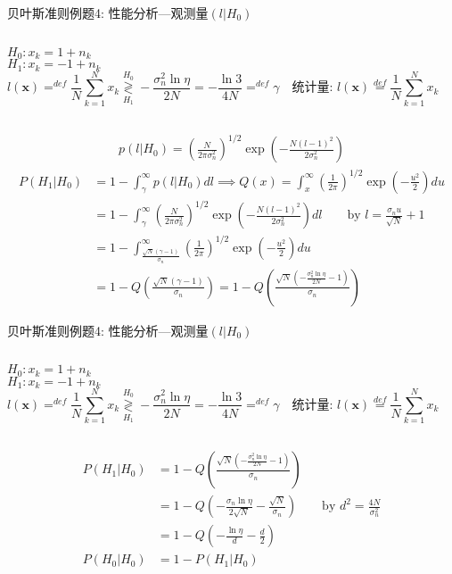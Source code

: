 \begin{frame}[shrink]{贝叶斯准则例题4: 性能分析---观测量$(l|H_0)$}
\begin{columns}
	$H_0:x_k=1+n_k$\\
	$H_1:x_k=-1+n_k$
	\[
	l(\bm{x})\mathop{=}^{def}\frac{1}{N}\sum\limits_{k=1}^{N}x_k\mathop{\gtrless}\limits_{H_1}^{H_0}-\frac{\sigma_n^2\ln\eta}{2N}=-\frac{\ln3}{4N}\mathop{=}^{def}\gamma \quad \textbf{统计量: }l(\bm{x})\mathop{=}\limits^{def}\frac{1}{N}\sum\limits_{k=1}^{N}x_k
	\]
\end{columns}
\begin{align*}
p(l|H_0)=\left(\frac{N}{2\pi\sigma_n^2}\right)^{1/2}\exp\left(-\frac{N(l-1)^2}{2\sigma_n^2}\right)
\end{align*}
\begin{align*}
P(H_1|H_0)&=1-\int_{\gamma}^{\infty}p(l|H_0)dl\implies Q(x)=\int_{x}^{\infty}\left(\frac{1}{2\pi}\right)^{1/2}\exp\left(-\frac{u^2}{2}\right)du\\
&=1-\int_{\gamma}^{\infty}\left(\frac{N}{2\pi\sigma_n^2}\right)^{1/2}\exp\left(-\frac{N(l-1)^2}{2\sigma_n^2}\right)dl\qquad \text{by } l=\frac{\sigma_nu}{\sqrt{N}}+1\\
&=1-\int_{\frac{\sqrt{N}(\gamma-1)}{\sigma_n}}^{\infty}\left(\frac{1}{2\pi}\right)^{1/2}\exp\left(-\frac{u^2}{2}\right)du\\
&=1-Q\left(\frac{\sqrt{N}(\gamma-1)}{\sigma_n}\right)=1-Q\left(\frac{\sqrt{N}\left(-\frac{\sigma_n^2\ln\eta}{2N}-1\right)}{\sigma_n}\right)
\end{align*}
\end{frame}

\begin{frame}[shrink]{贝叶斯准则例题4: 性能分析---观测量$(l|H_0)$}
\begin{columns}
	$H_0:x_k=1+n_k$\\
	$H_1:x_k=-1+n_k$
	\[
	l(\bm{x})\mathop{=}^{def}\frac{1}{N}\sum\limits_{k=1}^{N}x_k\mathop{\gtrless}\limits_{H_1}^{H_0}-\frac{\sigma_n^2\ln\eta}{2N}=-\frac{\ln3}{4N}\mathop{=}^{def}\gamma \quad \textbf{统计量: }l(\bm{x})\mathop{=}\limits^{def}\frac{1}{N}\sum\limits_{k=1}^{N}x_k
	\]
\end{columns}
\begin{align*}
P(H_1|H_0)&=1-Q\left(\frac{\sqrt{N}\left(-\frac{\sigma_n^2\ln\eta}{2N}-1\right)}{\sigma_n}\right)\\
&=1-Q\left(-\frac{\sigma_n\ln\eta}{2\sqrt{N}}-\frac{\sqrt{N}}{\sigma_n}\right)&& \text{by }d^2=\frac{4N}{\sigma_n^2}\\
&=1-Q\left(-\frac{\ln\eta}{d}-\frac{d}{2}\right)\\
P(H_0|H_0)&=1-P(H_1|H_0)
\end{align*}
\end{frame}

